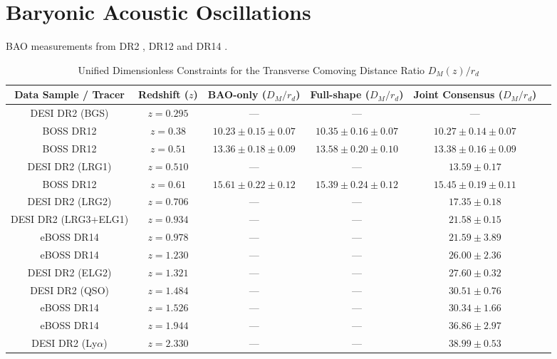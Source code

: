\documentclass{book}
\begin{document}
	\section{Baryonic Acoustic Oscillations}
	BAO measurements from DR2 \cite{DESI:2025zgx}, DR12 \cite{Alam_2017} and DR14 \cite{Zhao_2018}.
	\begin{table}[h!]
		\centering
		\footnotesize
		\begin{tabular}{cccccc}
			\hline\hline
			Data Sample / Tracer & Redshift ($z$) & BAO-only ($D_M/r_d$) & Full-shape ($D_M/r_d$) & Joint Consensus ($D_M/r_d$) \\ \hline
			DESI DR2 (BGS)        & $z = 0.295$ & — & — & — \\
			BOSS DR12             & $z = 0.38$  & $10.23 \pm 0.15 \pm 0.07$ & $10.35 \pm 0.16 \pm 0.07$ & $10.27 \pm 0.14 \pm 0.07$ \\
			BOSS DR12             & $z = 0.51$  & $13.36 \pm 0.18 \pm 0.09$ & $13.58 \pm 0.20 \pm 0.10$ & $13.38 \pm 0.16 \pm 0.09$ \\
			DESI DR2 (LRG1)       & $z = 0.510$ & — & — & $13.59 \pm 0.17$ \\
			BOSS DR12             & $z = 0.61$  & $15.61 \pm 0.22 \pm 0.12$ & $15.39 \pm 0.24 \pm 0.12$ & $15.45 \pm 0.19 \pm 0.11$ \\
			DESI DR2 (LRG2)       & $z = 0.706$ & — & — & $17.35 \pm 0.18$ \\
			DESI DR2 (LRG3+ELG1)  & $z = 0.934$ & — & — & $21.58 \pm 0.15$ \\
			eBOSS DR14            & $z = 0.978$ & — & — & $21.59 \pm 3.89$ \\
			eBOSS DR14            & $z = 1.230$ & — & — & $26.00 \pm 2.36$ \\
			DESI DR2 (ELG2)       & $z = 1.321$ & — & — & $27.60 \pm 0.32$ \\
			DESI DR2 (QSO)        & $z = 1.484$ & — & — & $30.51 \pm 0.76$ \\
			eBOSS DR14            & $z = 1.526$ & — & — & $30.34 \pm 1.66$ \\
			eBOSS DR14            & $z = 1.944$ & — & — & $36.86 \pm 2.97$ \\
			DESI DR2 (Ly$\alpha$) & $z = 2.330$ & — & — & $38.99 \pm 0.53$ \\ \hline\hline
		\end{tabular}
		\normalsize
		\caption{Unified Dimensionless Constraints for the Transverse Comoving Distance Ratio $D_M(z)/r_d$}
		\label{tab:BAO_DM_dimensionless}
	\end{table}
	
\end{document}

